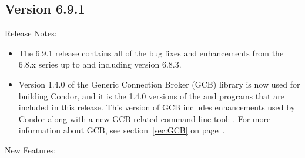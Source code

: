 \subsection*{\label{sec:New-6-9-1}Version 6.9.1}

\noindent Release Notes:

\begin{itemize}

\item The 6.9.1 release contains all of the bug fixes and enhancements
  from the 6.8.x series up to and including version 6.8.3.

\item Version 1.4.0 of the Generic Connection Broker (GCB) library is
  now used for building Condor, and it is the 1.4.0 versions of the
   and  programs that are
  included in this release.
  This version of GCB includes enhancements used by Condor
  along with a new GCB-related command-line tool:
  .
  For more information about GCB, see section~\ref{sec:GCB} on
  page~\pageref{sec:GCB}. 

\end{itemize}

\noindent New Features:

